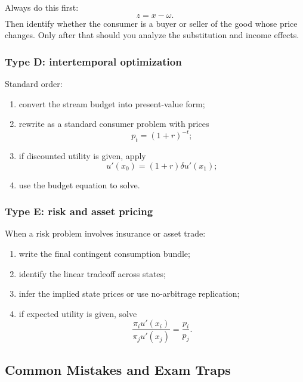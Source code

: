 \begin{examtip}[title={Method Pattern: endowment questions}]
Always do this first:
\[
z = x-\omega.
\]
Then identify whether the consumer is a buyer or seller of the good whose price changes. Only after that should you analyze the substitution and income effects.
\end{examtip}

\subsubsection{Type D: intertemporal optimization}

\begin{examtip}[title={Method Pattern: intertemporal questions}]
Standard order:
\begin{enumerate}
    \item convert the stream budget into present-value form;
    \item rewrite as a standard consumer problem with prices
    \[
    p_t=(1+r)^{-t};
    \]
    \item if discounted utility is given, apply
    \[
    u'(x_0)=(1+r)\delta u'(x_1);
    \]
    \item use the budget equation to solve.
\end{enumerate}
\end{examtip}

\subsubsection{Type E: risk and asset pricing}

\begin{examtip}[title={Method Pattern: contingent consumption / assets}]
When a risk problem involves insurance or asset trade:
\begin{enumerate}
    \item write the final contingent consumption bundle;
    \item identify the linear tradeoff across states;
    \item infer the implied state prices or use no-arbitrage replication;
    \item if expected utility is given, solve
    \[
    \frac{\pi_i u'(x_i)}{\pi_j u'(x_j)}=\frac{p_i}{p_j}.
    \]
\end{enumerate}
\end{examtip}

\subsection{Common Mistakes and Exam Traps}


